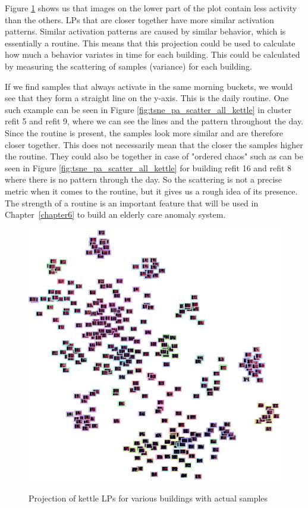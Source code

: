 Figure \ref{fig:tsne_pa_img_scatter_all_kettle} shows us that images on the lower part 
of the plot contain less activity than the others. 
LPs that are closer together have more similar activation patterns.
Similar activation patterns are caused by similar behavior, which is essentially a routine.
This means that this projection could be used to calculate how much a behavior variates in time for each building.
This could be calculated by measuring the scattering of samples (variance) for each building.

If we find samples that always activate in the same morning buckets, we would see that they form a straight line on the y-axis.
This is the daily routine. One such example can be seen in Figure \ref{fig:tsne_pa_scatter_all_kettle} in cluster refit 5 and refit 9, where we can see the lines and the pattern throughout the day. 
Since the routine is present, the samples look more similar and are therefore closer together. 
This does not necessarily mean that the closer the samples higher the routine.
They could also be together in case of "ordered chaos" such as can be seen in Figure \ref{fig:tsne_pa_scatter_all_kettle} for building refit 16 and refit 8 where there is no pattern through the day.
So the scattering is not a precise metric when it comes to the routine, but it gives us a rough idea of its presence.
The strength of a routine is an important feature that will be used
in Chapter \ref{chapter6} to build an elderly care anomaly system.

\begin{figure}[H]
	\centering
	\caption{Projection of kettle LPs for various buildings with actual samples}
	\includegraphics[width=.9\textwidth]{Figures/TSNE/TSNE_per_appliance/all/img_scatter_allkettle.png}
	\label{fig:tsne_pa_img_scatter_all_kettle}
\end{figure}

